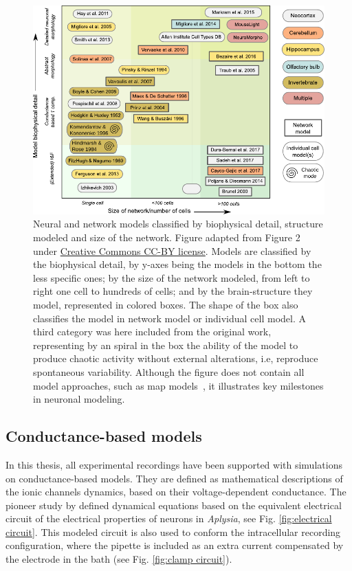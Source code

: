 \begin{figure}[bth!]
	\centering
	\includegraphics[width=\textwidth]{img/intro/models classification.pdf}
	\caption{Neural and network models classified by biophysical detail, structure modeled and size of the network. Figure adapted from Figure 2 \cite{gleeson_open_2019} under \href{http://creativecommons.org/licenses/by/4.0/}{Creative Commons CC-BY license}. Models are classified by the biophysical detail, by y-axes being the models in the bottom the less specific ones; by the size of the network modeled, from left to right one cell to hundreds of cells; and by the brain-structure they model, represented in colored boxes. The shape of the box also classifies the model in network model or individual cell model. A third category was here included from the original work, representing by an spiral in the box the ability of the model to produce chaotic activity without external alterations, i.e, reproduce spontaneous variability. Although the figure does not contain all model approaches, such as map models~\parencite{Rulkov2001}, it illustrates key milestones in neuronal modeling.}
	\label{fig:models-classification}
\end{figure}

\subsection{Conductance-based models}

In this thesis, all experimental recordings have been supported with simulations on conductance-based models. They are defined as mathematical descriptions of the ionic channels dynamics, based on their voltage-dependent conductance. The pioneer study by \cite{hodgkin_quantitative_1952} defined dynamical equations based on the equivalent electrical circuit of the electrical properties of neurons in \textit{Aplysia}, see Fig.  \ref{fig:electrical circuit}. This modeled circuit is also used to conform the intracellular recording configuration, where the pipette is included as an extra current compensated by the electrode in the bath (see Fig. \ref{fig:clamp circuit}).

